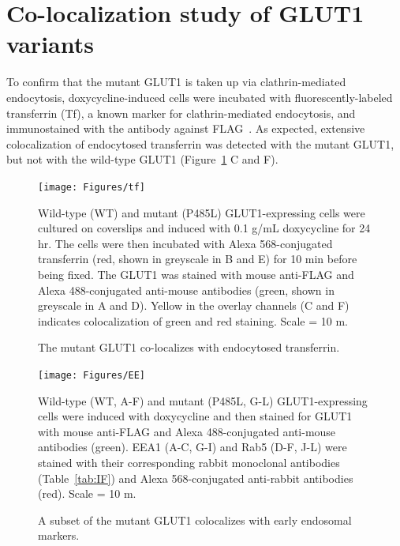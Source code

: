 \section{Co-localization study of GLUT1 variants}
To confirm that the mutant GLUT1 is taken up via clathrin-mediated endocytosis, doxycycline-induced cells were incubated with fluorescently-labeled transferrin (Tf), a known marker for clathrin-mediated endocytosis, and immunostained with the antibody against FLAG~\cite{Hanover}. As expected, extensive colocalization of endocytosed transferrin was detected with the mutant GLUT1, but not with the wild-type GLUT1 (Figure~\ref{fig:tf} C and F).
\begin{figure}[h]
\centering
\texttt{[image: Figures/tf]}
\caption{The mutant GLUT1 co-localizes with endocytosed transferrin.}
\vspace*{-3mm}
\small \justify
Wild-type (WT) and mutant (P485L) GLUT1-expressing cells were cultured on coverslips and induced with 0.1 \textmu g/mL doxycycline for 24 hr. The cells were then incubated with Alexa 568-conjugated transferrin (red, shown in greyscale in B and E) for 10 min before being fixed. The GLUT1 was stained with mouse anti-FLAG and Alexa 488-conjugated anti-mouse antibodies (green, shown in greyscale in A and D). Yellow in the overlay channels (C and F) indicates colocalization of green and red staining. Scale = 10 \textmu m.
\label{fig:tf}
\end{figure}
\begin{figure}[h]
\centering
\texttt{[image: Figures/EE]}
\caption{A subset of the mutant GLUT1 colocalizes with early endosomal markers.}
\vspace*{-3mm}
\small \justify
Wild-type (WT, A-F) and mutant (P485L, G-L) GLUT1-expressing cells were induced with doxycycline and then stained for GLUT1 with mouse anti-FLAG and Alexa 488-conjugated anti-mouse antibodies (green). EEA1 (A-C, G-I) and Rab5 (D-F, J-L) were stained with their corresponding rabbit monoclonal antibodies (Table~\ref{tab:IF}) and Alexa 568-conjugated anti-rabbit antibodies (red). Scale = 10 \textmu m.
\label{fig:ee}
\end{figure}


